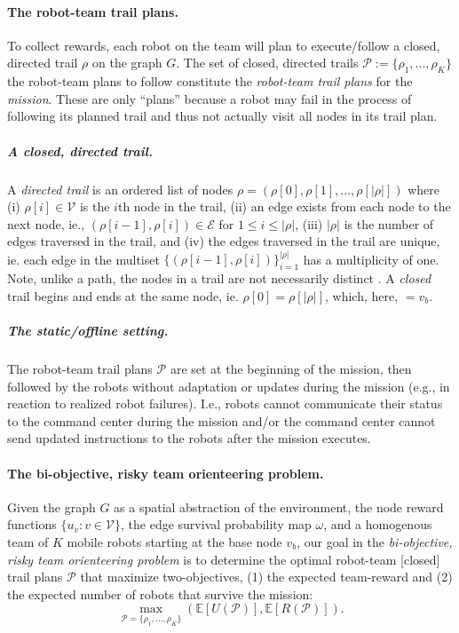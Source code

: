 \documentclass[11pt, oneside]{article}
\begin{document}
\paragraph{The robot-team trail plans.}
To collect rewards, each robot on the team will plan to execute/follow a closed, directed trail $\rho$ on the graph $G$.  
The set of closed, directed trails $\mathcal{P}:=\{\rho_1, ..., \rho_K\}$ the robot-team plans to follow constitute the \emph{robot-team trail plans} for the \emph{mission}. These are only ``plans'' because a robot may fail in the process of following its planned trail and thus not actually visit all nodes in its trail plan.

\vspace{-\baselineskip}
\subparagraph{A closed, directed trail.} 
A \emph{directed trail} is an ordered list of nodes $\rho = (\rho[0], \rho[1], ..., \rho[\lvert \rho \rvert])$ where
(i) $\rho[i] \in \mathcal{V}$ is the $i$th node in the trail,  
(ii) an edge exists from each node to the next node, ie., $(\rho[i-1], \rho[i])\in\mathcal{E}$ for $1 \leq i  \leq \lvert \rho \rvert$,
(iii) $\lvert \rho \rvert$ is the number of edges traversed in the trail,
and
(iv) the edges traversed in the trail are unique, ie. each edge in the multiset $\{(\rho[i-1], \rho[i])\}_{i=1}^{\lvert \rho \rvert}$ has a multiplicity of one.
Note, unlike a path, the nodes in a trail are not necessarily distinct \cite{wilson1979introduction}.
A \emph{closed} trail begins and ends at the same node, ie. $\rho [0]=\rho[\lvert \rho \rvert]$, which, here, $=v_b$.

\vspace{-\baselineskip}
\subparagraph{The static/offline setting.} 
The robot-team trail plans $\mathcal{P}$ are set at the beginning of the mission, then followed by the robots without adaptation or updates during the mission (e.g., in reaction to realized robot failures). 
I.e., robots cannot communicate their status to the command center during the mission and/or the command center cannot send updated instructions to the robots after the mission executes.

\paragraph{The bi-objective, risky team orienteering problem.}
Given the graph $G$ as a spatial abstraction of the environment, the node reward functions $\{u_v : v \in\mathcal{V}\}$, the edge survival probability map $\omega$, and a homogenous team of $K$ mobile robots starting at the base node $v_b$, our goal in the \emph{bi-objective, risky team orienteering problem} is to determine the optimal robot-team [closed] trail plans $\mathcal{P}$ that maximize two-objectives, (1) the expected team-reward and (2) the expected number of robots that survive the mission:
\begin{equation}
\max_{\mathcal{P}=\{\rho_1, ..., \rho_K\}} \left( \mathbb{E}[U(\mathcal{P})], \mathbb{E}[R(\mathcal{P})] \right).
\label{eq:the_two_objs}
\end{equation}
\end{document}
